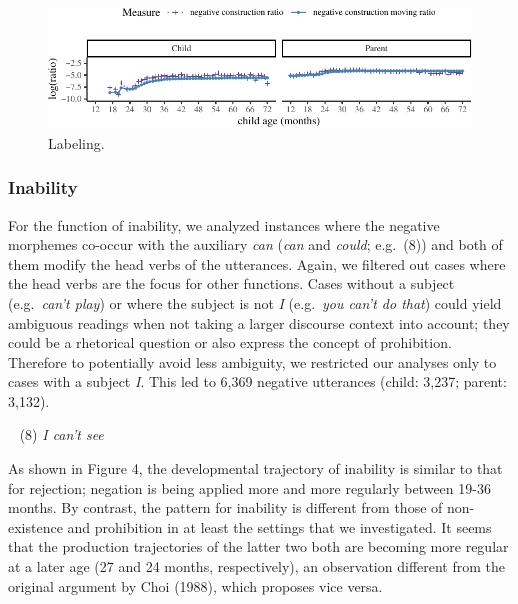 \documentclass[10pt, letterpaper]{article}
\newenvironment{CodeChunk}{}{}
\begin{document}
\begin{figure}[h!]

\begin{CodeChunk}


\begin{center}\includegraphics{figs/learning-1} \end{center}

\end{CodeChunk}
\caption[This image spans both columns]{Labeling.}\label{fig:labeling}
\end{figure}

\hypertarget{inability}{%
\subsubsection{Inability}\label{inability}}

For the function of inability, we analyzed instances where the negative
morphemes co-occur with the auxiliary \emph{can} (\emph{can} and
\emph{could}; e.g.~(8)) and both of them modify the head verbs of the
utterances. Again, we filtered out cases where the head verbs are the
focus for other functions. Cases without a subject (e.g.~\emph{can't
play}) or where the subject is not \emph{I} (e.g.~\emph{you can't do
that}) could yield ambiguous readings when not taking a larger discourse
context into account; they could be a rhetorical question or also
express the concept of prohibition. Therefore to potentially avoid less
ambiguity, we restricted our analyses only to cases with a subject
\emph{I}. This led to 6,369 negative utterances (child: 3,237; parent:
3,132).

~ (8) \emph{I can't see}

As shown in Figure 4, the developmental trajectory of inability is
similar to that for rejection; negation is being applied more and more
regularly between 19-36 months. By contrast, the pattern for inability
is different from those of non-existence and prohibition in at least the
settings that we investigated. It seems that the production trajectories
of the latter two both are becoming more regular at a later age (27 and
24 months, respectively), an observation different from the original
argument by Choi (1988), which proposes vice versa.
\end{document}
